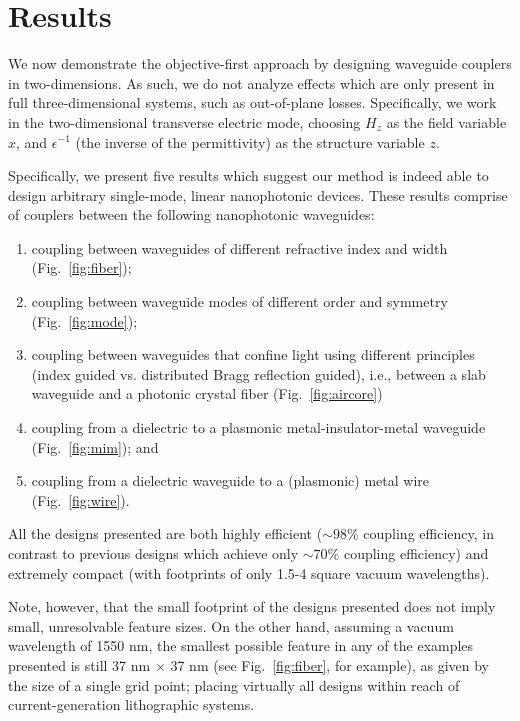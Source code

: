 \section{Results}
We now demonstrate the objective-first approach
    by designing waveguide couplers in two-dimensions.
As such, we do not analyze effects which are only present in full 
    three-dimensional systems, such as out-of-plane losses.
Specifically, we work in the two-dimensional transverse electric mode,
    choosing $H_z$ as the field variable $x$,
    and $\epsilon^{-1}$ (the inverse of the permittivity) 
    as the structure variable $z$.

Specifically, we present five results which suggest our method
    is indeed able to design arbitrary single-mode, linear nanophotonic devices.
These results comprise of couplers between 
    the following nanophotonic waveguides:
    \begin{enumerate}
    \item coupling between waveguides of different refractive index and width
        (Fig.~\ref{fig:fiber});
    \item coupling between waveguide modes of different order and symmetry
        (Fig.~\ref{fig:mode});
    \item coupling between waveguides that confine light 
        using different principles 
        (index guided vs. distributed Bragg reflection guided), 
        i.e., between a slab waveguide and a photonic crystal fiber
        (Fig.~\ref{fig:aircore})
    \item coupling from a dielectric to a plasmonic metal-insulator-metal 
        waveguide (Fig.~\ref{fig:mim}); and
    \item coupling from a dielectric waveguide to a (plasmonic) metal wire
        (Fig.~\ref{fig:wire}).
    \end{enumerate}
All the designs presented are both highly efficient 
    ($\sim 98\%$ coupling efficiency, in contrast to previous designs
    which achieve only $\sim 70\%$ coupling efficiency\cite{veronis,yang})
    and extremely compact 
    (with footprints of only 1.5-4 square vacuum wavelengths).

Note, however, that the small footprint of the designs presented does not 
    imply small, unresolvable feature sizes.
On the other hand, assuming a vacuum wavelength of 1550 nm,
    the smallest possible feature in any of the examples presented is still
    37 nm $\times$ 37 nm (see Fig.~\ref{fig:fiber}, for example),
    as given by the size of a single grid point;
    placing virtually all designs within reach of current-generation lithographic
    systems.

